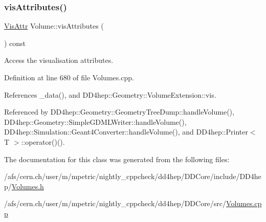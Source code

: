 \subsubsection{\texorpdfstring{vis\+Attributes()}{visAttributes()}}
{\footnotesize\ttfamily \hyperlink{class_d_d4hep_1_1_geometry_1_1_vis_attr}{Vis\+Attr} Volume\+::vis\+Attributes (\begin{DoxyParamCaption}{ }\end{DoxyParamCaption}) const}



Access the visualisation attributes. 



Definition at line 680 of file Volumes.\+cpp.



References \+\_\+data(), and D\+D4hep\+::\+Geometry\+::\+Volume\+Extension\+::vis.



Referenced by D\+D4hep\+::\+Geometry\+::\+Geometry\+Tree\+Dump\+::handle\+Volume(), D\+D4hep\+::\+Geometry\+::\+Simple\+G\+D\+M\+L\+Writer\+::handle\+Volume(), D\+D4hep\+::\+Simulation\+::\+Geant4\+Converter\+::handle\+Volume(), and D\+D4hep\+::\+Printer$<$ T $>$\+::operator()().



The documentation for this class was generated from the following files\+:\begin{DoxyCompactItemize}
\item 
/afs/cern.\+ch/user/m/mpetric/nightly\+\_\+cppcheck/dd4hep/\+D\+D\+Core/include/\+D\+D4hep/\hyperlink{_volumes_8h}{Volumes.\+h}\item 
/afs/cern.\+ch/user/m/mpetric/nightly\+\_\+cppcheck/dd4hep/\+D\+D\+Core/src/\hyperlink{_volumes_8cpp}{Volumes.\+cpp}\end{DoxyCompactItemize}
